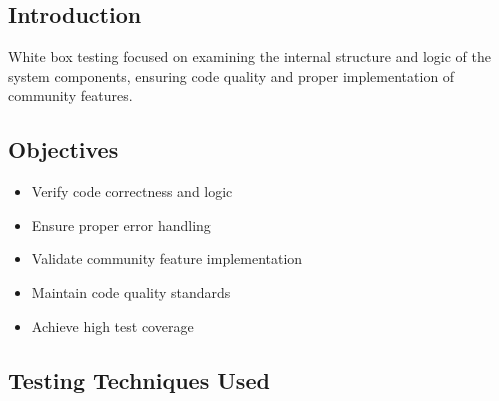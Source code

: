 \subsection{Introduction}
White box testing focused on examining the internal structure and logic of the system components, ensuring code quality and proper implementation of community features.

\subsection{Objectives}
\begin{itemize}
    \item Verify code correctness and logic
    \item Ensure proper error handling
    \item Validate community feature implementation
    \item Maintain code quality standards
    \item Achieve high test coverage
\end{itemize}

\subsection{Testing Techniques Used}

